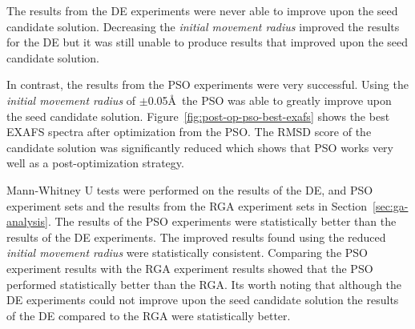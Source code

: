 The results from the DE experiments were never able to improve upon the seed candidate solution. Decreasing the \textit{initial movement radius} improved the results for the DE but it was still unable to produce results that improved upon the seed candidate solution.

In contrast, the results from the PSO experiments were very successful. Using the \textit{initial movement radius} of $\pm$0.05\AA\ the PSO was able to greatly improve upon the seed candidate solution. Figure~\ref{fig:post-op-pso-best-exafs} shows the best EXAFS spectra after optimization from the PSO. The RMSD score of the candidate solution was significantly reduced which shows that PSO works very well as a post-optimization strategy.

\begin{figure*}
	\centering
	\caption{OEC EXAFS Spectra Comparison}
	\label{fig:post-op-pso-best-exafs}
\end{figure*}

Mann-Whitney U tests were performed on the results of the DE, and PSO experiment sets and the results from the RGA experiment sets in Section~\ref{sec:ga-analysis}. The results of the PSO experiments were statistically better than the results of the DE experiments. The improved results found using the reduced \textit{initial movement radius} were statistically consistent. Comparing the PSO experiment results with the RGA experiment results showed that the PSO performed statistically better than the RGA. Its worth noting that although the DE experiments could not improve upon the seed candidate solution the results of the DE compared to the RGA were statistically better.